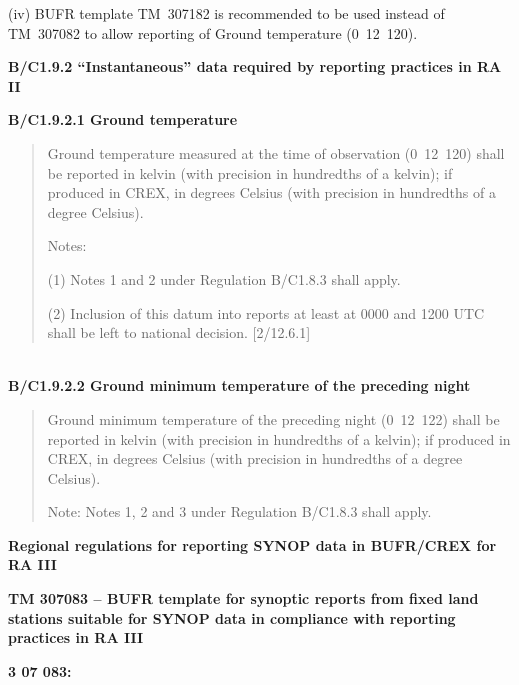 (iv) BUFR template TM~307182 is recommended to be used instead of TM~307082 to allow reporting of Ground temperature (0~12~120).

\textbf{B/C1.9.2 ``Instantaneous'' data required by reporting practices in RA II}

\textbf{B/C1.9.2.1 Ground temperature}

\begin{quote}
Ground temperature measured at the time of observation (0~12~120) shall be reported in kelvin (with precision in hundredths of a kelvin); if produced in CREX, in degrees Celsius (with precision in hundredths of a degree Celsius).

Notes:

(1) Notes 1 and 2 under Regulation B/C1.8.3 shall apply.

(2) Inclusion of this datum into reports at least at 0000 and 1200 UTC shall be left to national decision. {[}2/12.6.1{]}
\end{quote}

\textbf{\\
B/C1.9.2.2 Ground minimum temperature of the preceding night}

\begin{quote}
Ground minimum temperature of the preceding night (0~12~122) shall be reported in kelvin (with precision in hundredths of a kelvin); if produced in CREX, in degrees Celsius (with precision in hundredths of a degree Celsius).

Note: Notes 1, 2 and 3 under Regulation B/C1.8.3 shall apply.
\end{quote}

\textbf{Regional regulations for reporting SYNOP data in BUFR/CREX for RA III}

\textbf{TM 307083 -- BUFR template for synoptic reports from fixed land stations suitable for SYNOP data in compliance with reporting practices in RA III}

\textbf{3 07 083:}

